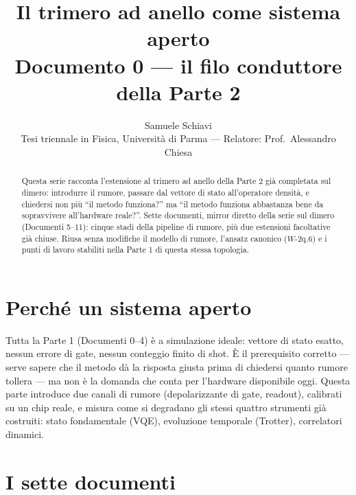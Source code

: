 \documentclass[11pt,a4paper]{article}
\title{\bfseries Il trimero ad anello come sistema aperto\\[2pt]
\large Documento 0 --- il filo conduttore della Parte 2}
\author{Samuele Schiavi \\ \small Tesi triennale in Fisica, Università di Parma
--- Relatore: Prof.\ Alessandro Chiesa}
\date{}
\begin{document}
\maketitle
\thispagestyle{fancy}

\begin{abstract}
\noindent
Questa serie racconta l'estensione al trimero ad anello della Parte 2 già
completata sul dimero: introdurre il rumore, passare dal vettore di stato
all'operatore densità, e chiedersi non più ``il metodo funziona?'' ma
``il metodo funziona abbastanza bene da sopravvivere all'hardware reale?''.
Sette documenti, mirror diretto della serie sul dimero (Documenti 5--11):
cinque stadi della pipeline di rumore, più due estensioni facoltative già
chiuse. Riusa senza modifiche il modello di rumore, l'ansatz canonico
($W$-2q.6) e i punti di lavoro stabiliti nella Parte 1 di questa stessa
topologia.
\end{abstract}

\section{Perché un sistema aperto}

Tutta la Parte 1 (Documenti 0--4) è a simulazione ideale: vettore di stato
esatto, nessun errore di gate, nessun conteggio finito di shot. È il
prerequisito corretto --- serve sapere che il metodo dà la risposta giusta
prima di chiedersi quanto rumore tollera --- ma non è la domanda che conta
per l'hardware disponibile oggi. Questa parte introduce due canali di
rumore (depolarizzante di gate, readout), calibrati su un chip reale, e
misura come si degradano gli stessi quattro strumenti già costruiti:
stato fondamentale (VQE), evoluzione temporale (Trotter), correlatori
dinamici.


\section{I sette documenti}
\end{document}
